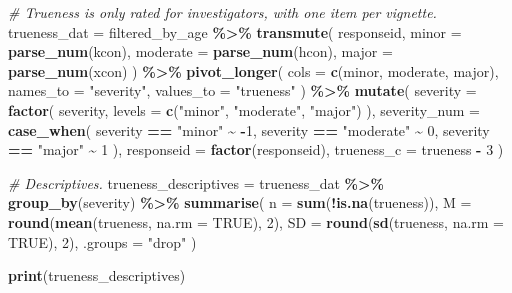 \documentclass[
]{article}
\newenvironment{Shaded}{\begin{snugshade}}{\end{snugshade}}
\newcommand{\AttributeTok}[1]{\textcolor[rgb]{0.13,0.29,0.53}{#1}}
\newcommand{\CommentTok}[1]{\textcolor[rgb]{0.56,0.35,0.01}{\textit{#1}}}
\newcommand{\ConstantTok}[1]{\textcolor[rgb]{0.56,0.35,0.01}{#1}}
\newcommand{\DecValTok}[1]{\textcolor[rgb]{0.00,0.00,0.81}{#1}}
\newcommand{\FunctionTok}[1]{\textcolor[rgb]{0.13,0.29,0.53}{\textbf{#1}}}
\newcommand{\NormalTok}[1]{#1}
\newcommand{\OtherTok}[1]{\textcolor[rgb]{0.56,0.35,0.01}{#1}}
\newcommand{\SpecialCharTok}[1]{\textcolor[rgb]{0.81,0.36,0.00}{\textbf{#1}}}
\newcommand{\StringTok}[1]{\textcolor[rgb]{0.31,0.60,0.02}{#1}}
\begin{document}
\begin{Shaded}
\begin{Highlighting}[]
\CommentTok{\# Trueness is only rated for investigators, with one item per vignette.}
\NormalTok{trueness\_dat }\OtherTok{=}\NormalTok{ filtered\_by\_age }\SpecialCharTok{\%\textgreater{}\%}
  \FunctionTok{transmute}\NormalTok{(}
\NormalTok{    responseid,}
    \AttributeTok{minor =} \FunctionTok{parse\_num}\NormalTok{(kcon),}
    \AttributeTok{moderate =} \FunctionTok{parse\_num}\NormalTok{(hcon),}
    \AttributeTok{major =} \FunctionTok{parse\_num}\NormalTok{(xcon)}
\NormalTok{  ) }\SpecialCharTok{\%\textgreater{}\%}
  \FunctionTok{pivot\_longer}\NormalTok{(}
    \AttributeTok{cols =} \FunctionTok{c}\NormalTok{(minor, moderate, major),}
    \AttributeTok{names\_to =} \StringTok{"severity"}\NormalTok{,}
    \AttributeTok{values\_to =} \StringTok{"trueness"}
\NormalTok{  ) }\SpecialCharTok{\%\textgreater{}\%}
  \FunctionTok{mutate}\NormalTok{(}
    \AttributeTok{severity =} \FunctionTok{factor}\NormalTok{(}
\NormalTok{      severity,}
      \AttributeTok{levels =} \FunctionTok{c}\NormalTok{(}\StringTok{"minor"}\NormalTok{, }\StringTok{"moderate"}\NormalTok{, }\StringTok{"major"}\NormalTok{)}
\NormalTok{    ),}
    \AttributeTok{severity\_num =} \FunctionTok{case\_when}\NormalTok{(}
\NormalTok{      severity }\SpecialCharTok{==} \StringTok{"minor"} \SpecialCharTok{\textasciitilde{}} \SpecialCharTok{{-}}\DecValTok{1}\NormalTok{,}
\NormalTok{      severity }\SpecialCharTok{==} \StringTok{"moderate"} \SpecialCharTok{\textasciitilde{}} \DecValTok{0}\NormalTok{,}
\NormalTok{      severity }\SpecialCharTok{==} \StringTok{"major"} \SpecialCharTok{\textasciitilde{}} \DecValTok{1}
\NormalTok{    ),}
    \AttributeTok{responseid =} \FunctionTok{factor}\NormalTok{(responseid),}
    \AttributeTok{trueness\_c =}\NormalTok{ trueness }\SpecialCharTok{{-}} \DecValTok{3}
\NormalTok{  )}


\CommentTok{\# Descriptives.}
\NormalTok{trueness\_descriptives }\OtherTok{=}\NormalTok{ trueness\_dat }\SpecialCharTok{\%\textgreater{}\%}
  \FunctionTok{group\_by}\NormalTok{(severity) }\SpecialCharTok{\%\textgreater{}\%}
  \FunctionTok{summarise}\NormalTok{(}
    \AttributeTok{n =} \FunctionTok{sum}\NormalTok{(}\SpecialCharTok{!}\FunctionTok{is.na}\NormalTok{(trueness)),}
    \AttributeTok{M =} \FunctionTok{round}\NormalTok{(}\FunctionTok{mean}\NormalTok{(trueness, }\AttributeTok{na.rm =} \ConstantTok{TRUE}\NormalTok{), }\DecValTok{2}\NormalTok{),}
    \AttributeTok{SD =} \FunctionTok{round}\NormalTok{(}\FunctionTok{sd}\NormalTok{(trueness, }\AttributeTok{na.rm =} \ConstantTok{TRUE}\NormalTok{), }\DecValTok{2}\NormalTok{),}
    \AttributeTok{.groups =} \StringTok{"drop"}
\NormalTok{  )}

\FunctionTok{print}\NormalTok{(trueness\_descriptives)}
\end{Highlighting}
\end{Shaded}
\end{document}

